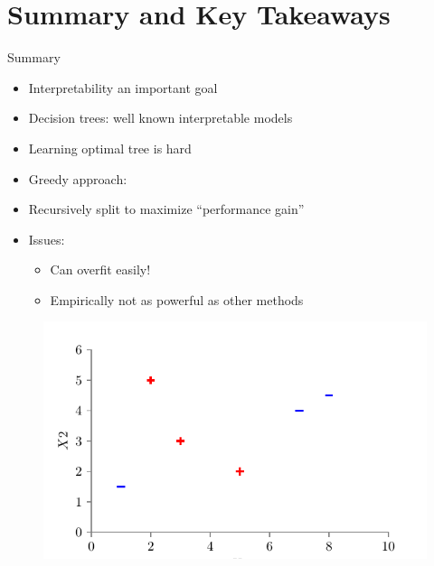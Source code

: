\documentclass[usenames,dvipsnames]{beamer}
\begin{document}
\section{Summary and Key Takeaways}

\begin{frame}{Summary}
\begin{itemize}
\item Interpretability an important goal
\item Decision trees: well known interpretable models
\pause
\item Learning optimal tree is hard
\item Greedy approach:
\item Recursively split to maximize “performance gain”
\pause
\item Issues:
\begin{itemize}
	\item Can overfit easily!
	\item Empirically not as powerful as other methods
\end{itemize}
\end{itemize}

\end{frame}

\begin{frame}

	\begin{figure}
		\centering
		\includegraphics{../assets/decision-trees/figures/dt_weighted/fig1.pdf}
	\end{figure}

	\end{frame}
\end{document}
